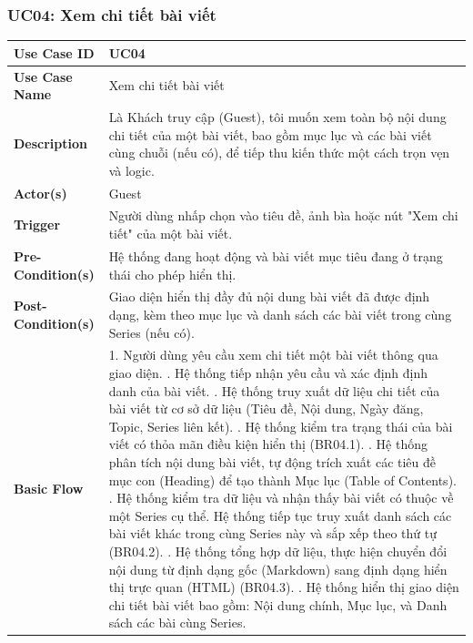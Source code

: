 \documentclass[a4paper,12pt]{article}
\begin{document}
\subsubsection{UC04: Xem chi tiết bài viết}
\begin{longtable}{|p{4cm}|p{11.5cm}|}
\hline
\textbf{Use Case ID} & UC04 \\ \hline
\textbf{Use Case Name} & Xem chi tiết bài viết \\ \hline
\textbf{Description} & Là Khách truy cập (Guest), tôi muốn xem toàn bộ nội dung chi tiết của một bài viết, bao gồm mục lục và các bài viết cùng chuỗi (nếu có), để tiếp thu kiến thức một cách trọn vẹn và logic. \\ \hline
\textbf{Actor(s)} & Guest \\ \hline
\textbf{Trigger} & Người dùng nhấp chọn vào tiêu đề, ảnh bìa hoặc nút "Xem chi tiết" của một bài viết. \\ \hline
\textbf{Pre-Condition(s)} & Hệ thống đang hoạt động và bài viết mục tiêu đang ở trạng thái cho phép hiển thị. \\ \hline
\textbf{Post-Condition(s)} & Giao diện hiển thị đầy đủ nội dung bài viết đã được định dạng, kèm theo mục lục và danh sách các bài viết trong cùng Series (nếu có). \\ \hline
\textbf{Basic Flow} & 
1. Người dùng yêu cầu xem chi tiết một bài viết thông qua giao diện. \newline
2. Hệ thống tiếp nhận yêu cầu và xác định định danh của bài viết. \newline
3. Hệ thống truy xuất dữ liệu chi tiết của bài viết từ cơ sở dữ liệu (Tiêu đề, Nội dung, Ngày đăng, Topic, Series liên kết). \newline
4. Hệ thống kiểm tra trạng thái của bài viết có thỏa mãn điều kiện hiển thị (BR04.1). \newline
5. Hệ thống phân tích nội dung bài viết, tự động trích xuất các tiêu đề mục con (Heading) để tạo thành Mục lục (Table of Contents). \newline
6. Hệ thống kiểm tra dữ liệu và nhận thấy bài viết có thuộc về một Series cụ thể. Hệ thống tiếp tục truy xuất danh sách các bài viết khác trong cùng Series này và sắp xếp theo thứ tự (BR04.2). \newline
7. Hệ thống tổng hợp dữ liệu, thực hiện chuyển đổi nội dung từ định dạng gốc (Markdown) sang định dạng hiển thị trực quan (HTML) (BR04.3). \newline
8. Hệ thống hiển thị giao diện chi tiết bài viết bao gồm: Nội dung chính, Mục lục, và Danh sách các bài cùng Series. \newline

\end{longtable}
\end{document}
